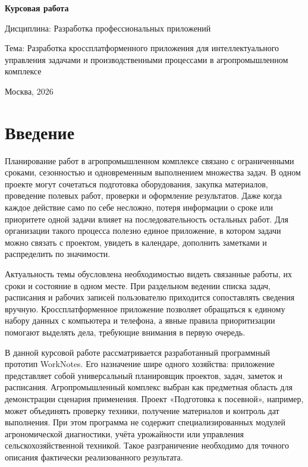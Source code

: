 \documentclass[14pt,a4paper]{extarticle}
\begin{document}
\begin{titlepage}
\centering
\vspace*{3cm}
{\bfseries Курсовая работа\par}
\vspace{1.5cm}
Дисциплина: Разработка профессиональных приложений\par
\vspace{1.5cm}
Тема: Разработка кроссплатформенного приложения для интеллектуального управления задачами и производственными процессами в агропромышленном комплексе\par
\vfill
Москва, 2026\par
\end{titlepage}
\setcounter{page}{2}
\tableofcontents
\clearpage

\section*{Введение}

Планирование работ в агропромышленном комплексе связано с ограниченными сроками, сезонностью и одновременным выполнением множества задач. В одном проекте могут сочетаться подготовка оборудования, закупка материалов, проведение полевых работ, проверки и оформление результатов. Даже когда каждое действие само по себе несложно, потеря информации о сроке или приоритете одной задачи влияет на последовательность остальных работ. Для организации такого процесса полезно единое приложение, в котором задачи можно связать с проектом, увидеть в календаре, дополнить заметками и распределить по значимости.

Актуальность темы обусловлена необходимостью видеть связанные работы, их сроки и состояние в одном месте. При раздельном ведении списка задач, расписания и рабочих записей пользователю приходится сопоставлять сведения вручную. Кроссплатформенное приложение позволяет обращаться к единому набору данных с компьютера и телефона, а явные правила приоритизации помогают выделять дела, требующие внимания в первую очередь.

В данной курсовой работе рассматривается разработанный программный прототип WorkNotes. Его назначение шире одного хозяйства: приложение представляет собой универсальный планировщик проектов, задач, заметок и расписания. Агропромышленный комплекс выбран как предметная область для демонстрации сценария применения. Проект «Подготовка к посевной», например, может объединять проверку техники, получение материалов и контроль дат выполнения. При этом программа не содержит специализированных модулей агрономической диагностики, учёта урожайности или управления сельскохозяйственной техникой. Такое разграничение необходимо для точного описания фактически реализованного результата.
\end{document}
